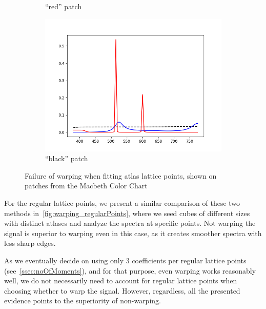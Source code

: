 \begin{figure}[t]
\begin{subfigure}[t]{0.32\textwidth}
	\caption{``red'' patch}
	\label{fig:warping_alp_red}
	\end{subfigure} \hspace{0.1em}
	\begin{subfigure}[t]{0.32\textwidth}
		\includegraphics[width=\linewidth]{img/results_warping_black.png}
		\caption{``black'' patch}
		\label{fig:warping_alp_black}
	\end{subfigure}
	\caption{Failure of warping when fitting atlas lattice points, shown on patches from the Macbeth Color Chart}
	\label{fig:warping_atlasLatticePoints}
\end{figure}

For the regular lattice points, we present a similar comparison of these two methods in~\cref{fig:warping_regularPoints}, where we seed cubes of different sizes with distinct atlases and analyze the spectra at specific points. Not warping the signal is superior to warping even in this case, as it creates smoother spectra with less sharp edges. 

As we eventually decide on using only 3 coefficients per regular lattice points (see~\cref{ssec:noOfMoments}), and for that purpose, even warping works reasonably well, we do not necessarily need to account for regular lattice points when choosing whether to warp the signal. However, regardless, all the presented evidence points to the superiority of non-warping.

